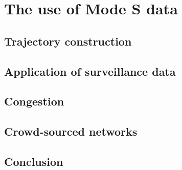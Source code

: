 \chapter{The use of Mode S data}
\section{Trajectory construction}
\section{Application of surveillance data}
\section{Congestion}
\section{Crowd-sourced networks}
\section{Conclusion}
